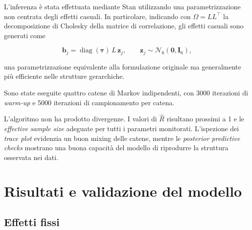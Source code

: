\documentclass[11pt, a4paper]{article}
\begin{document}
L'inferenza è stata effettuata mediante Stan utilizzando una parametrizzazione non centrata degli effetti casuali. In particolare, indicando con $\Omega = LL^\top$ la decomposizione di Cholesky della matrice di correlazione, gli effetti casuali sono generati come

\[
  \mathbf b_j
  =
  \operatorname{diag}(\boldsymbol{\tau})
  \,
  L
  \,
  \mathbf z_j,
  \qquad
  \mathbf z_j \sim \mathcal N_6(\mathbf 0,\mathbf I_6),
\]

una parametrizzazione equivalente alla formulazione originale ma generalmente più efficiente nelle strutture gerarchiche.

Sono state eseguite quattro catene di Markov indipendenti, con 3000 iterazioni di \textit{warm-up} e 5000 iterazioni di campionamento per catena.

L'algoritmo non ha prodotto divergenze. I valori di $\hat R$ risultano prossimi a 1 e le \textit{effective sample size} adeguate per tutti i parametri monitorati. L'ispezione dei \textit{trace plot} evidenzia un buon mixing delle catene, mentre le \textit{posterior predictive checks} mostrano una buona capacità del modello di riprodurre la struttura osservata nei dati.

\section{Risultati e validazione del modello}
\label{sec:risultati}

\subsection{Effetti fissi}
\end{document}
